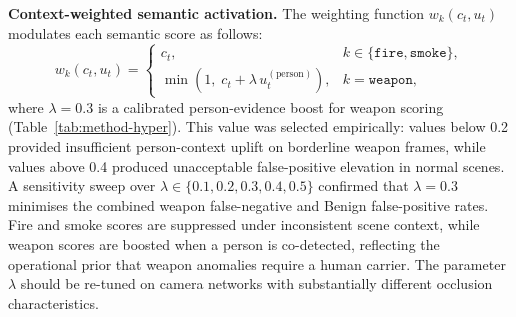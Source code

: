 \documentclass[a4paper,fleqn]{cas-dc}
\begin{document}
\textbf{Context-weighted semantic activation.} The weighting function $w_k(c_t, u_t)$ modulates each semantic score as follows:
\begin{equation}
\label{eq:wk}
w_k(c_t, u_t) =
\begin{cases}
c_t, & k \in \{\texttt{fire}, \texttt{smoke}\}, \\
\min(1,\; c_t + \lambda\, u_t^{(\text{person})}), & k = \texttt{weapon},
\end{cases}
\end{equation}
where $\lambda = 0.3$ is a calibrated person-evidence boost for weapon scoring (Table~\ref{tab:method-hyper}). This value was selected empirically: values below 0.2 provided insufficient person-context uplift on borderline weapon frames, while values above 0.4 produced unacceptable false-positive elevation in normal scenes. A sensitivity sweep over $\lambda \in \{0.1, 0.2, 0.3, 0.4, 0.5\}$ confirmed that $\lambda = 0.3$ minimises the combined weapon false-negative and Benign false-positive rates. Fire and smoke scores are suppressed under inconsistent scene context, while weapon scores are boosted when a person is co-detected, reflecting the operational prior that weapon anomalies require a human carrier. The parameter $\lambda$ should be re-tuned on camera networks with substantially different occlusion characteristics.
 
\begin{table}[!ht]
\caption{Feature groups, operators, and consolidated threshold values used in the evaluation.}
\label{tab:method-features}
\centering
\scriptsize
\setlength{\tabcolsep}{3pt}
\renewcommand{\arraystretch}{1.05}
\end{table}
 
\end{document}
